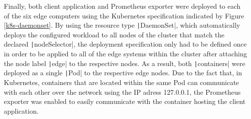 Finally, both client application and Prometheus exporter were deployed to each of the six edge computers using the Kubernetes specification indicated by Figure \ref{k8s-daemonset}. By using the resource type \texttt|DaemonSet|, which automatically deploys the configured workload to all nodes of the cluster that match the declared \texttt|nodeSelector|, the deployment specification only had to be defined once in order to be applied to all of the edge systems within the cluster after attaching the node label \texttt|edge| to the respective nodes. As a result, both \texttt|containers| were deployed as a single \texttt|Pod|
to the respective edge nodes. Due to the fact that, in Kubernetes, containers that are located within the same Pod can communicate with each other over the network using the IP adress 127.0.0.1, the Prometheus exporter was enabled to easily communicate with the container hosting the client application.





